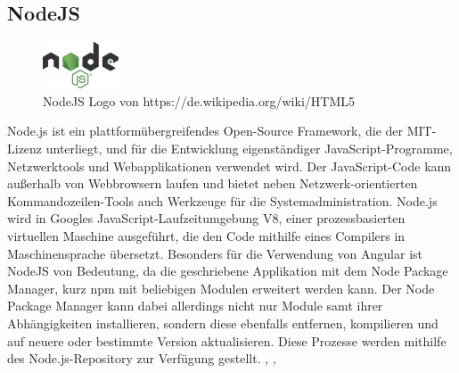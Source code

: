 \subsection{NodeJS}
\begin{figure}
  \begin{center}
    \includegraphics[width=0.2\textwidth]{pics/NodeJS_Logo.png}
    \caption{NodeJS Logo von https://de.wikipedia.org/wiki/HTML5}
  \end{center}
\end{figure}
Node.js ist ein plattformübergreifendes Open-Source Framework, die der MIT-Lizenz unterliegt, und für 
die Entwicklung eigenständiger JavaScript-Programme, Netzwerktools und Webapplikationen verwendet wird.
Der JavaScript-Code kann außerhalb von Webbrowsern laufen und bietet neben Netzwerk-orientierten 
Kommandozeilen-Tools auch Werkzeuge für die Systemadministration. 
Node.js wird in Googles JavaScript-Laufzeitumgebung V8, einer prozessbasierten virtuellen Maschine 
ausgeführt, die den Code mithilfe eines Compilers in Maschinensprache übersetzt.  
\newline
\newline
Besonders für die Verwendung von Angular ist NodeJS von Bedeutung, da die geschriebene Applikation 
mit dem Node Package Manager, kurz npm mit beliebigen Modulen erweitert werden kann. Der Node Package Manager
kann dabei allerdings nicht nur Module samt ihrer Abhängigkeiten installieren, sondern diese ebenfalls
entfernen, kompilieren und auf neuere oder bestimmte Version aktualisieren. Diese Prozesse werden mithilfe
des Node.js-Repository zur Verfügung gestellt. \cite{nodejs_nodejs_nodate}, \cite{noauthor_nodejs_2022}, \cite{noauthor_nodejs_nodate}

